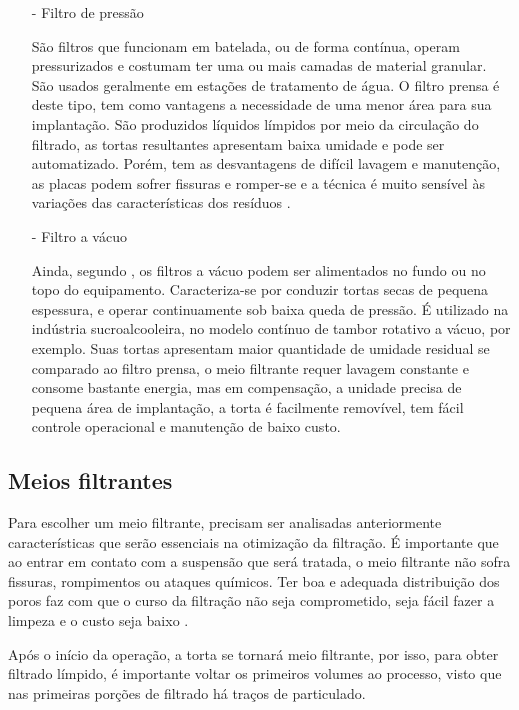 \begin{enumerate}

\item[-] Filtro de pressão
 
  São filtros que funcionam em batelada, ou de forma contínua, operam
  pressurizados e costumam ter uma ou mais camadas de material granular. São
  usados geralmente em estações de tratamento de água. O filtro prensa é deste
  tipo, tem como vantagens a necessidade de uma menor área para sua implantação.
  São produzidos líquidos límpidos por meio da circulação do filtrado, as tortas
  resultantes apresentam baixa umidade e pode ser automatizado. Porém, tem as
  desvantagens de difícil lavagem e manutenção, as placas podem sofrer fissuras
  e romper-se e a técnica é muito sensível às variações das características dos
  resíduos .


\item[-] Filtro a vácuo

  Ainda, segundo , os filtros a vácuo podem ser alimentados
  no fundo ou no topo do equipamento. Caracteriza-se por conduzir tortas secas
  de pequena espessura, e operar continuamente sob baixa queda de pressão. É
  utilizado na indústria sucroalcooleira, no modelo contínuo de tambor rotativo
  a vácuo, por exemplo. Suas tortas apresentam maior quantidade de umidade
  residual se comparado ao filtro prensa, o meio filtrante requer lavagem
  constante e consome bastante energia, mas em compensação, a unidade precisa de
  pequena área de implantação, a torta é facilmente removível, tem fácil
  controle operacional e manutenção de baixo custo.


\end{enumerate}


\subsection{Meios filtrantes}
\label{subsec:meiosfiltrantes}

Para escolher um meio filtrante, precisam ser analisadas anteriormente
características que serão essenciais na otimização da filtração. É importante
que ao entrar em contato com a suspensão que será tratada, o meio filtrante não
sofra fissuras, rompimentos ou ataques químicos. Ter boa e adequada distribuição
dos poros faz com que o curso da filtração não seja comprometido, seja fácil
fazer a limpeza e o custo seja baixo .

Após o início da operação, a torta se tornará meio filtrante, por isso, para
obter filtrado límpido, é importante voltar os primeiros volumes ao processo,
visto que nas primeiras porções de filtrado há traços de particulado.


